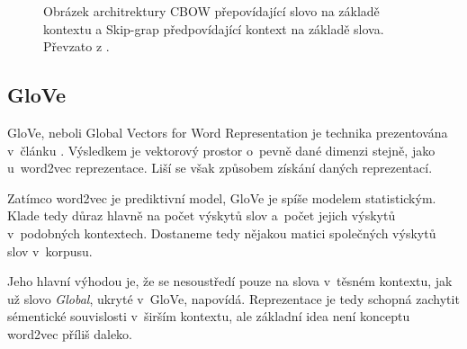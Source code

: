 \begin{figure}[hbt]
	\centering
	\caption{Obrázek architrektury CBOW přepovídající slovo na základě kontextu a Skip-grap předpovídající kontext na základě slova. Převzato z \cite{mikolov2013embeddings}.}
	\label{cbow_and_skipgram}
\end{figure}


\subsection{GloVe}

GloVe, neboli Global Vectors for Word Representation je technika prezentována v~článku \cite{GloVe}. Výsledkem je vektorový prostor o~pevně dané dimenzi stejně, jako u~word2vec reprezentace. Liší se však způsobem získání daných reprezentací.\par Zatímco word2vec je prediktivní model, GloVe je spíše modelem statistickým. Klade tedy důraz hlavně na počet výskytů slov a~počet jejich výskytů v~podobných kontextech. Dostaneme tedy nějakou matici společných výskytů slov v~korpusu.\par
Jeho hlavní výhodou je, že se nesoustředí pouze na slova v~těsném kontextu, jak už slovo \emph{Global}, ukryté v~GloVe, napovídá. Reprezentace je tedy schopná zachytit sémentické souvislosti v~širším kontextu, ale základní idea není konceptu word2vec příliš daleko.


